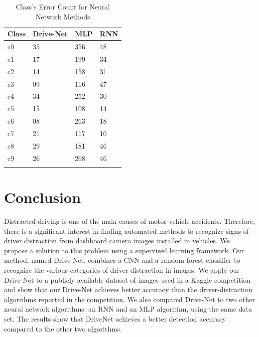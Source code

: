 \documentclass[conference,compsoc]{IEEEtran}
\begin{document}
\begin{table}[!htbp]
\caption{Class's Error Count for Neural Network Methods}
\label{Drive-Net/Table2}
\def\arraystretch{1}
\ignorespaces 
\centering 
\begin{tabulary}{\linewidth}{LLLL}
\hline Class &  Drive-Net & MLP & RNN\\
\hline 
 c0 &
   35 &
   356 &
   48\\
 c1 &
   17 &
   199 &
   34\\
 c2 &
   14 &
   158 &
   31\\
 c3 &
   09 &
   116 &
   47\\
 c4 &
   34 &
   252 &
   30\\
 c5 &
   15 &
   108 &
   14\\
 c6 &
   08 &
   263 &
   18\\
 c7 &
   21 &
   117 &
   10\\
 c8 &
   29 &
   181 &
   46\\
 c9 &
   26 &
   268 &
   46\\
   
 &
   &
   &
  \\
\hline 
\end{tabulary}\par 
\end{table}

    
\section{Conclusion}
Distracted driving is one of the main causes of motor vehicle accidents. Therefore, there is a significant interest in finding automated methods to recognize signs of driver distraction from dashboard camera images installed in vehicles. We propose a solution to this problem using a supervised learning framework. Our method, named Drive-Net, combines a CNN and a random forest classifier to recognize the various categories of driver distraction in images. We apply our Drive-Net to a publicly available dataset of images used in a Kaggle competition and show that our Drive-Net achieves better accuracy than the driver-distraction algorithms reported in the competition. We also compared Drive-Net to two other neural network algorithms: an RNN and an MLP algorithm, using the same data set. The results show that DriveNet achieves a better detection accuracy compared to the other two algorithms.





\end{document}

